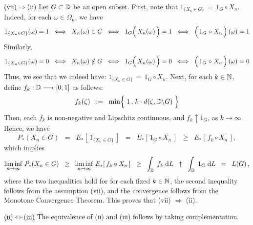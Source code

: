 \vskip 0.5cm \noindent
\underline{(vii)\;$\Longrightarrow$\;(ii)}
\vskip 0.2cm \noindent
Let $G \subset \mathbb{D}$ be an open subset.
First, note that $1_{\{X_{n} \in G\}} \,=\, 1_{G} \circ X_{n}$.
Indeed, for each $\omega \in \Omega_{n}$, we have
\begin{equation*}
1_{\{X_{n} \in G\}}(\omega) = 1
\;\;\Longleftrightarrow\;\; X_{n}(\omega) \in G
\;\;\Longleftrightarrow\;\; 1_{G}\!\left(\,X_{n}(\overset{{\color{white}-}}{\omega})\,\right) = 1
\;\;\Longleftrightarrow\;\; \left(\,1_{G} \overset{{\color{white}-}}{\circ} X_{n}\,\right)(\omega) = 1
\end{equation*}
Similarly,
\begin{equation*}
1_{\{X_{n} \in G\}}(\omega) = 0
\;\;\Longleftrightarrow\;\; X_{n}(\omega) \notin G
\;\;\Longleftrightarrow\;\; 1_{G}\!\left(\,X_{n}(\overset{{\color{white}-}}{\omega})\,\right) = 0
\;\;\Longleftrightarrow\;\; \left(\,1_{G} \overset{{\color{white}-}}{\circ} X_{n}\,\right)(\omega) = 0
\end{equation*}
Thus, we see that we indeed have: $1_{\{X_{n} \in G\}} \,=\, 1_{G} \circ X_{n}$.
Next, for each $k \in \mathbb{N}$, define $f_{k} : \mathbb{D} \longrightarrow [0,1]$ as follows:
\begin{equation*}
f_{k}(\zeta)
\;\; := \;\;
	\min\!\left\{\;1\,\overset{{\color{white}\vert}}{,}\;k \cdot d(\zeta,\D \backslash G)\;\right\}
\end{equation*}
Then, each $f_{k}$ is non-negative and Lipschitz continuous, and
$f_{k} \uparrow 1_{G}$, as $k \longrightarrow \infty$. Hence, we have
\begin{equation*}
P_{*}(X_{n} \in G)
\;\; = \;\; E_{*}\!\left[\,1_{\{X_{n} \in G\}}\,\right]
\;\; = \;\; E_{*}\!\left[\,1_{G} \circ X_{n}\,\right]
\;\; \geq \;\; E_{*}\!\left[\,f_{k} \circ X_{n}\,\right],
\end{equation*}
which implies
\begin{equation*}
\underset{n\rightarrow\infty}{\liminf}\;P_{*}(X_{n} \in G)
\;\; \geq \;\; \underset{n\rightarrow\infty}{\liminf}\;E_{*}\!\left[\,f_{k} \circ X_{n}\,\right]
\;\; \geq \;\; \int_{\mathbb{D}}\; f_{k} \;\textnormal{d} L
\;\; \uparrow \;\; \int_{\mathbb{D}}\; 1_{G} \;\textnormal{d} L
\;\; = \;\; L(G)\,,
\end{equation*}
where the two inequalities hold for for each fixed $k \in \mathbb{N}$, the second inequality follows from the assumption (vii), and
the convergence follows from the Monotone Convergence Theorem.
This proves that (vii) $\Longrightarrow$ (ii).

\vskip 0.5cm \noindent
\underline{(ii)\;$\Longleftrightarrow$\;(iii)}
\vskip 0.2cm \noindent
The equivalence of (ii) and (iii) follows by taking complementation.

